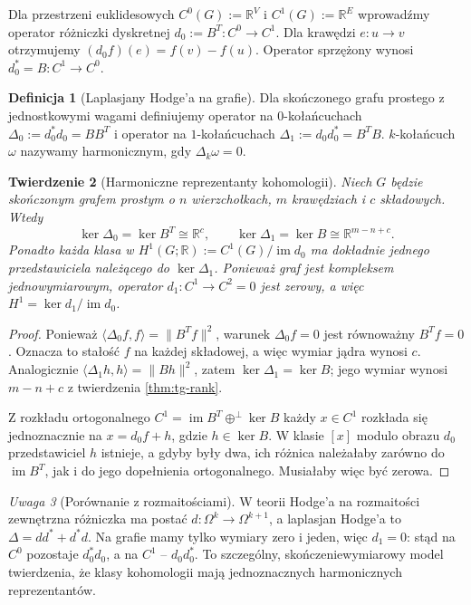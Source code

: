 \documentclass[11pt,a4paper]{report}
\numberwithin{equation}{section}
\theoremstyle{plain}
\newtheorem{twierdzenie}{Twierdzenie}[section]
\theoremstyle{definition}
\newtheorem{definicja}[twierdzenie]{Definicja}
\theoremstyle{remark}
\newtheorem{uwaga}[twierdzenie]{Uwaga}
\begin{document}
Dla przestrzeni euklidesowych $C^0(G):=\mathbb R^V$
i $C^1(G):=\mathbb R^E$ wprowadźmy operator
różniczki dyskretnej $d_0:=B^T:C^0\to C^1$.
Dla krawędzi $e:u\to v$ otrzymujemy
$(d_0f)(e)=f(v)-f(u)$.
Operator sprzężony wynosi $d_0^*=B:C^1\to C^0$.

\begin{definicja}[Laplasjany Hodge'a na grafie]
Dla skończonego grafu prostego z jednostkowymi wagami
definiujemy operator na $0$-kołańcuchach
$\Delta_0:=d_0^*d_0=BB^T$ i operator na
$1$-kołańcuchach $\Delta_1:=d_0d_0^*=B^TB$.
$k$-kołańcuch $\omega$ nazywamy harmonicznym,
gdy $\Delta_k\omega=0$.
\end{definicja}

\begin{twierdzenie}[Harmoniczne reprezentanty kohomologii]
\label{thm:tg-hodge-harmonic}
Niech $G$ będzie skończonym grafem prostym o $n$ wierzchołkach,
$m$ krawędziach i $c$ składowych. Wtedy
\[
\ker\Delta_0=\ker B^T\cong\mathbb R^c,
\qquad
\ker\Delta_1=\ker B\cong\mathbb R^{m-n+c}.
\]
Ponadto każda klasa w
$H^1(G;\mathbb R):=C^1(G)/\operatorname{im}d_0$
ma dokładnie jednego przedstawiciela należącego do
$\ker\Delta_1$. Ponieważ graf jest kompleksem
jednowymiarowym, operator $d_1:C^1\to C^2=0$ jest zerowy,
a więc $H^1=\ker d_1/\operatorname{im}d_0$.
\end{twierdzenie}

\begin{proof}
Ponieważ $\langle\Delta_0f,f\rangle=\|B^Tf\|^2$,
warunek $\Delta_0f=0$ jest równoważny $B^Tf=0$.
Oznacza to stałość $f$ na każdej składowej,
a więc wymiar jądra wynosi $c$.
Analogicznie $\langle\Delta_1h,h\rangle=\|Bh\|^2$,
zatem $\ker\Delta_1=\ker B$; jego wymiar
wynosi $m-n+c$ z twierdzenia \ref{thm:tg-rank}.

Z rozkładu ortogonalnego
$C^1=\operatorname{im}B^T\oplus^\perp\ker B$
każdy $x\in C^1$ rozkłada się jednoznacznie na
$x=d_0f+h$, gdzie $h\in\ker B$. W klasie $[x]$
modulo obrazu $d_0$ przedstawiciel $h$ istnieje,
a gdyby były dwa, ich różnica należałaby zarówno
do $\operatorname{im}B^T$, jak i do jego dopełnienia
ortogonalnego. Musiałaby więc być zerowa.
\end{proof}

\begin{uwaga}[Porównanie z rozmaitościami]
W teorii Hodge'a na rozmaitości zewnętrzna różniczka
ma postać $d:\Omega^k\to\Omega^{k+1}$, a laplasjan
Hodge'a to $\Delta=dd^*+d^*d$. Na grafie mamy tylko
wymiary zero i jeden, więc $d_1=0$: stąd na
$C^0$ pozostaje $d_0^*d_0$, a na $C^1$ -- $d_0d_0^*$.
To szczególny, skończeniewymiarowy model twierdzenia,
że klasy kohomologii mają jednoznacznych harmonicznych
reprezentantów.
\end{uwaga}
\end{document}
